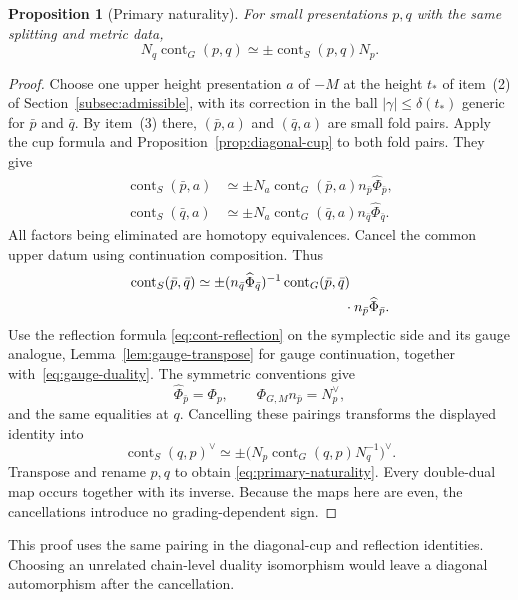 \documentclass[11pt]{amsart}
\newtheorem{proposition}[theorem]{Proposition}
\theoremstyle{definition}
\theoremstyle{remark}
\theoremstyle{plain}
\numberwithin{equation}{section}
\newcommand{\cont}{\operatorname{cont}}
\begin{document}
\begin{proposition}[Primary naturality]\label{prop:primary-naturality}
For small presentations $p,q$ with the same splitting and metric data,
\begin{equation}\label{eq:primary-naturality}
 N_q\cont_G(p,q)\simeq
              \pm\cont_S(p,q)N_p.
\end{equation}
\end{proposition}
\begin{proof}
Choose one upper height presentation $a$
of $-M$ at the height $t_*$ of item~(2)
of Section~\ref{subsec:admissible}, with
its correction in the ball
$|\gamma|\le\delta(t_*)$ generic for $\bar p$
and $\bar q$. By item~(3) there,
$(\bar p,a)$ and $(\bar q,a)$ are
small fold pairs. Apply the cup formula and
Proposition~\ref{prop:diagonal-cup} to
both fold pairs. They give
\begin{align*}
 \cont_S(\bar p,a)&\simeq
 \pm N_a\cont_G(\bar p,a)
                       n_{\bar p}\widehat\Phi_{\bar p},\\
 \cont_S(\bar q,a)&\simeq
 \pm N_a\cont_G(\bar q,a)
                       n_{\bar q}\widehat\Phi_{\bar q}.
\end{align*}
All factors being eliminated are
homotopy equivalences. Cancel the
common upper datum using continuation
composition. Thus
\begin{align*}
 \cont_S(\bar p,\bar q)\simeq\pm
 &(n_{\bar q}\widehat\Phi_{\bar q})^{-1}
       \cont_G(\bar p,\bar q)\\
 &\hspace{30mm}\cdot
       n_{\bar p}\widehat\Phi_{\bar p}.
\end{align*}
Use the reflection formula
\eqref{eq:cont-reflection} on the
symplectic side and its gauge analogue, Lemma~\ref{lem:gauge-transpose} for gauge continuation, together with~\eqref{eq:gauge-duality}. The
symmetric conventions give
\[
 \widehat\Phi_{\bar p}=\Phi_p,
 \qquad \Phi_{G,M}n_{\bar p}=N_p^\vee,
\]
and the same equalities at $q$.
Cancelling these pairings transforms
the displayed identity into
\[
 \cont_S(q,p)^\vee\simeq
 \pm\bigl(N_p\cont_G(q,p)N_q^{-1}\bigr)^\vee.
\]
Transpose and rename $p,q$ to obtain
\eqref{eq:primary-naturality}.
Every double-dual map occurs together
with its inverse. Because the maps
here are even, the cancellations
introduce no grading-dependent sign.
\end{proof}

This proof uses the same pairing in
the diagonal-cup and reflection
identities. Choosing an unrelated
chain-level duality isomorphism would
leave a diagonal automorphism after
the cancellation.
\end{document}
